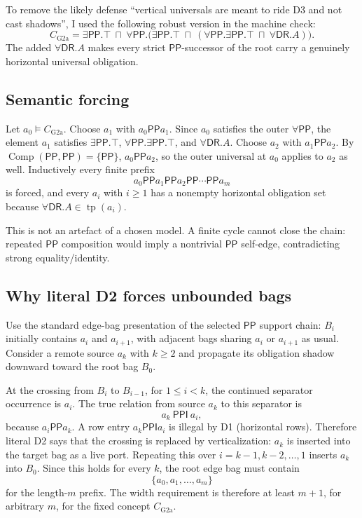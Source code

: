 \documentclass[11pt]{article}
\newcommand{\PP}{\mathsf{PP}}
\newcommand{\PPI}{\mathsf{PPI}}
\newcommand{\DR}{\mathsf{DR}}
\newcommand{\Comp}{\operatorname{Comp}}
\newcommand{\tp}{\operatorname{tp}}
\begin{document}
To remove the likely defense ``vertical universals are meant to ride D3 and
not cast shadows'', I used the following robust version in the machine check:
\[
C_{\mathrm{G2a}}=\exists\PP.\top\ \sqcap\
\forall\PP.\bigl(\exists\PP.\top\ \sqcap\
        (\forall\PP.\exists\PP.\top\ \sqcap\ \forall\DR.A)\bigr).
\]
The added $\forall\DR.A$ makes every strict $\PP$-successor of the root carry
a genuinely horizontal universal obligation.

\subsection{Semantic forcing}

Let $a_0\models C_{\mathrm{G2a}}$.  Choose $a_1$ with $a_0\PP a_1$.  Since
$a_0$ satisfies the outer $\forall\PP$, the element $a_1$ satisfies
$\exists\PP.\top$, $\forall\PP.\exists\PP.\top$, and $\forall\DR.A$.  Choose
$a_2$ with $a_1\PP a_2$.  By $\Comp(\PP,\PP)=\{\PP\}$, $a_0\PP a_2$, so the
outer universal at $a_0$ applies to $a_2$ as well.  Inductively every finite
prefix
\[
  a_0\PP a_1\PP a_2\PP\cdots\PP a_m
\]
is forced, and every $a_i$ with $i\ge 1$ has a nonempty horizontal obligation
set because $\forall\DR.A\in\tp(a_i)$.

This is not an artefact of a chosen model.  A finite cycle cannot close the
chain: repeated $\PP$ composition would imply a nontrivial $\PP$ self-edge,
contradicting strong equality/identity.

\subsection{Why literal D2 forces unbounded bags}

Use the standard edge-bag presentation of the selected $\PP$ support chain:
$B_i$ initially contains $a_i$ and $a_{i+1}$, with adjacent bags sharing
$a_i$ or $a_{i+1}$ as usual.  Consider a remote source $a_k$ with
$k\ge 2$ and propagate its obligation shadow downward toward the root bag
$B_0$.

At the crossing from $B_i$ to $B_{i-1}$, for $1\le i<k$, the continued
separator occurrence is $a_i$.  The true relation from source $a_k$ to this
separator is
\[
  a_k\ \PPI\ a_i,
\]
because $a_i\PP a_k$.  A row entry $a_k\PPI a_i$ is illegal by D1
(horizontal rows).  Therefore literal D2 says that the crossing is replaced by
verticalization: $a_k$ is inserted into the target bag as a live port.  Repeating
this over $i=k-1,k-2,\ldots,1$ inserts $a_k$ into $B_0$.  Since this holds for
every $k$, the root edge bag must contain
\[
  \{a_0,a_1,\ldots,a_m\}
\]
for the length-$m$ prefix.  The width requirement is therefore at least $m+1$,
for arbitrary $m$, for the fixed concept $C_{\mathrm{G2a}}$.
\end{document}
